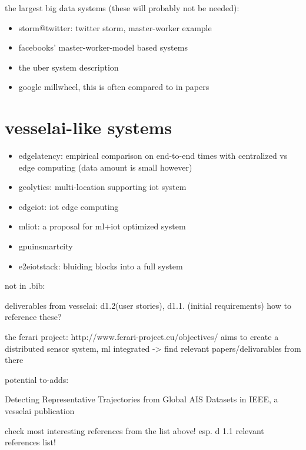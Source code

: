 \documentclass{article}
\begin{document}
the largest big data systems (these will probably not be needed):

\begin{itemize}
    \item \cite{storm@twitter} storm@twitter: twitter storm, master-worker example
    \item \cite{facebook} facebooks' master-worker-model based systems
    \item \cite{uber} the uber system description
    \item \cite{millwheel} google millwheel, this is often compared to in papers 
\end{itemize} 


\chapter{vesselai-like systems}

\begin{itemize}
    \item \cite{edgelatency} edgelatency: empirical comparison on end-to-end times with centralized vs edge computing (data amount is small however)
    \item \cite{geolytics} geolytics: multi-location supporting iot system
    \item \cite{edgeiot} edgeiot: iot edge computing
    \item \cite{mliot} mliot: a proposal for ml+iot optimized system
    \item \cite{gpuinsmartcity} gpuinsmartcity
    \item \cite{e2eiotstack} e2eiotstack: bluiding blocks into a full system
\end{itemize}

not in .bib:

deliverables from vesselai: d1.2(user stories), d1.1. (initial requirements) how to reference these?

the ferari project: http://www.ferari-project.eu/objectives/ aims to create a distributed sensor system, ml integrated
-> find relevant papers/delivarables from there

potential to-adds:

Detecting Representative Trajectories from Global AIS Datasets in IEEE, a vesselai publication

check most interesting references from the list above! esp. d 1.1 relevant references list!

\printbibliography
\end{document}

